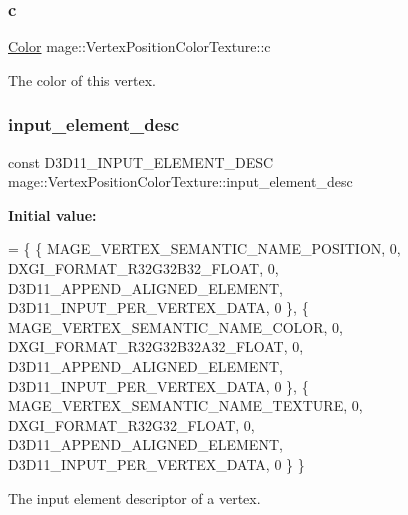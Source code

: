 \subsubsection{\texorpdfstring{c}{c}}
{\footnotesize\ttfamily \hyperlink{structmage_1_1_color}{Color} mage\+::\+Vertex\+Position\+Color\+Texture\+::c}

The color of this vertex. \hypertarget{structmage_1_1_vertex_position_color_texture_a4be64221f4ae8e2bf37bb83fb59f2f0c}{}\label{structmage_1_1_vertex_position_color_texture_a4be64221f4ae8e2bf37bb83fb59f2f0c} 
\subsubsection{\texorpdfstring{input\+\_\+element\+\_\+desc}{input\_element\_desc}}
{\footnotesize\ttfamily const D3\+D11\+\_\+\+I\+N\+P\+U\+T\+\_\+\+E\+L\+E\+M\+E\+N\+T\+\_\+\+D\+E\+SC mage\+::\+Vertex\+Position\+Color\+Texture\+::input\+\_\+element\+\_\+desc\hspace{0.3cm}{\ttfamily [static]}}

{\bfseries Initial value\+:}
\begin{DoxyCode}
= \{
        \{ MAGE\_VERTEX\_SEMANTIC\_NAME\_POSITION, 0, DXGI\_FORMAT\_R32G32B32\_FLOAT,    0, 
      D3D11\_APPEND\_ALIGNED\_ELEMENT, D3D11\_INPUT\_PER\_VERTEX\_DATA, 0 \},
        \{ MAGE\_VERTEX\_SEMANTIC\_NAME\_COLOR,    0, DXGI\_FORMAT\_R32G32B32A32\_FLOAT, 0, 
      D3D11\_APPEND\_ALIGNED\_ELEMENT, D3D11\_INPUT\_PER\_VERTEX\_DATA, 0 \},
        \{ MAGE\_VERTEX\_SEMANTIC\_NAME\_TEXTURE,  0, DXGI\_FORMAT\_R32G32\_FLOAT,       0, 
      D3D11\_APPEND\_ALIGNED\_ELEMENT, D3D11\_INPUT\_PER\_VERTEX\_DATA, 0 \}
    \}
\end{DoxyCode}
The input element descriptor of a vertex. \hypertarget{structmage_1_1_vertex_position_color_texture_a435a9387a5dda4fb5aff9b9b3f11e736}{}\label{structmage_1_1_vertex_position_color_texture_a435a9387a5dda4fb5aff9b9b3f11e736} 
